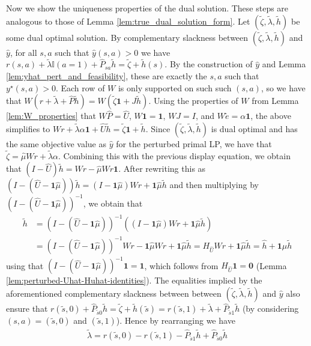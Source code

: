 \documentclass[mnsc,nonblindrev]{informs3}
\newcommand{\Phat}{\widehat{P}}
\newcommand{\one}{\mathbf{1}}
\newcommand{\hhat}{\widehat{h}}
\newcommand{\zero}{\mathbf{0}}
\newcommand{\muhat}{\widehat{\mu}}
\newcommand{\uhat}{\widehat{U}}
\newcommand{\yhat}{\widehat{y}}
\begin{document}
\begin{APPENDICES}
Now we show the uniqueness properties of the dual solution.
These steps are analogous to those of Lemma \ref{lem:true_dual_solution_form}. Let $(\tilde{\zeta}, \tilde{\lambda}, \tilde{h})$ be some dual optimal solution.
By complementary slackness between $(\tilde{\zeta}, \tilde{\lambda}, \tilde{h})$ and $\yhat$, for all $s,a$ such that $\yhat(s,a)>0$ we have $r(s,a)+\tilde{\lambda} \mathbb{I}(a=1) + \Phat_{sa}\tilde{h} = \tilde{\zeta} + \tilde{h}(s)$. By the construction of $\yhat$ and Lemma \ref{lem:yhat_pert_and_feasibility}, these are exactly the $s,a$ such that $y^\star(s,a)>0$. Each row of $W$ is only supported on such such $(s,a)$, so we have that
$
    W(r + \tilde{\lambda} + \Phat \tilde{h}) = W(\tilde{\zeta} \one + J \tilde{h}).
$
Using the properties of $W$ from Lemma \ref{lem:W_properties} that $W\Phat = \uhat$, $W \one = \one$, $WJ = I$, and $W \tilde{e} = \alpha \one$, the above simplifies to
$
    Wr + \tilde{\lambda} \alpha \one + \uhat \tilde{h} = \tilde{\zeta} \one + \tilde{h}.
$
Since $(\tilde{\zeta}, \tilde{\lambda}, \tilde{h})$ is dual optimal and has the same objective value as $\yhat$ for the perturbed primal LP, we have that $\tilde{\zeta} = \muhat W r + \tilde{\lambda} \alpha$. Combining this with the previous display equation, we obtain that
$
    (I - \uhat)\tilde{h} = Wr - \muhat W r \one.
$
After rewriting this as $(I - (\uhat - \one \muhat)) \tilde{h} = (I - \one \muhat) Wr + \one \muhat \tilde{h}$ and then multiplying by $(I - (\uhat - \one \muhat))^{-1}$, we obtain that
\begin{align*}
    \tilde{h} &= (I - (\uhat - \one \muhat))^{-1} \left( (I - \one \muhat) Wr + \one \muhat \tilde{h} \right) \\
    &= (I - (\uhat - \one \muhat))^{-1}Wr - \one \muhat Wr + \one \muhat \tilde{h} 
    = H_{\uhat} Wr + \one \muhat \tilde{h} = \hhat + \one \muhat \tilde{h}
\end{align*}
using that $(I - (\uhat - \one \muhat))^{-1} \one = \one$, which follows from $H_{\uhat} \one = \zero$ (Lemma \ref{lem:perturbed-Uhat-Huhat-identities}).
The equalities implied by the aforementioned complementary slackness between between $(\tilde{\zeta}, \tilde{\lambda}, \tilde{h})$ and $\yhat$ also ensure that
$
    r(\tilde{s},0) + \Phat_{\tilde{s}0}\tilde{h} = \tilde{\zeta} + \tilde{h}(\tilde{s}) = r(\tilde{s},1)+\tilde{\lambda}  + \Phat_{\tilde{s}1}\tilde{h}
$
(by considering $(s,a)= (\tilde{s}, 0)$ and $(\tilde{s},1)$). Hence by rearranging we have
\begin{align*}
    \tilde{\lambda} 
    = r(\tilde{s},0)-r(\tilde{s},1) - \Phat_{\tilde{s}1}\tilde{h} +\Phat_{\tilde{s}0}\tilde{h} 

\end{align*}
\end{APPENDICES}
\end{document}
